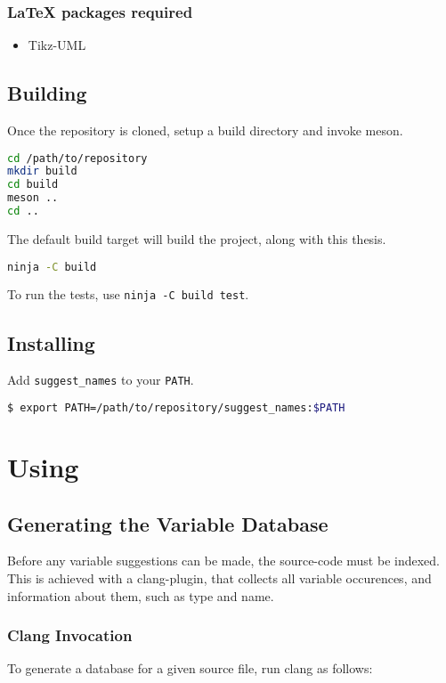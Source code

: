 \subsubsection{\LaTeX{} packages required}
\begin{itemize}
	\item Tikz-UML \cite{tikzuml}
\end{itemize}

\subsection{Building}
Once the repository is cloned, setup a build directory and invoke meson.
\begin{lstlisting}[language=bash]
cd /path/to/repository
mkdir build
cd build
meson ..
cd ..
\end{lstlisting}

The default build target will build the project, along with this thesis.
\begin{lstlisting}[language=bash]
ninja -C build
\end{lstlisting}

To run the tests, use \lstinline|ninja -C build test|.

\subsection{Installing}
Add \lstinline|suggest_names| to your \lstinline|PATH|.
\begin{lstlisting}[language=bash]
$ export PATH=/path/to/repository/suggest_names:$PATH
\end{lstlisting}


\section{Using}
\subsection{Generating the Variable Database}
Before any variable suggestions can be made, the source-code must be indexed.
This is achieved with a clang-plugin, that collects all variable occurences,
and information about them, such as type and name.

\subsubsection{Clang Invocation}
To generate a database for a given source file, run clang as follows:

